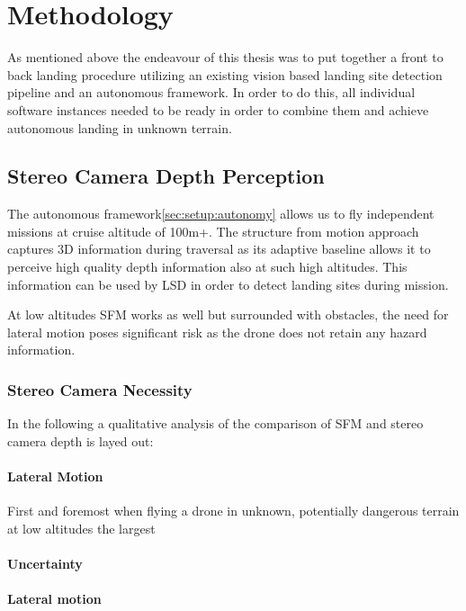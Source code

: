 \chapter{Methodology}
\label{sec:methodology}

As mentioned above the endeavour of this thesis was to put together a front to back landing procedure utilizing an existing vision based landing site detection pipeline and an autonomous framework. In order to do this, all individual software instances needed to be ready in order to combine them and achieve autonomous landing in unknown terrain.

\section{Stereo Camera Depth Perception} \label{sec:StereoDepth}

The autonomous framework\ref{sec:setup:autonomy} allows us to fly independent missions at cruise altitude of 100m+. The structure from motion approach captures 3D information during traversal as its adaptive baseline allows it to perceive high quality depth information also at such high altitudes. This information can be used by LSD in order to detect landing sites during mission. 

At low altitudes SFM works as well but surrounded with obstacles, the need for lateral motion poses significant risk as the drone does not retain any hazard information. 

\subsection{Stereo Camera Necessity}

In the following a qualitative analysis of the comparison of SFM and stereo camera depth is layed out:

\subsubsection{Lateral Motion}

First and foremost when flying a drone in unknown, potentially dangerous terrain at low altitudes the largest

\subsubsection{Uncertainty}

\subsubsection{Lateral motion}

